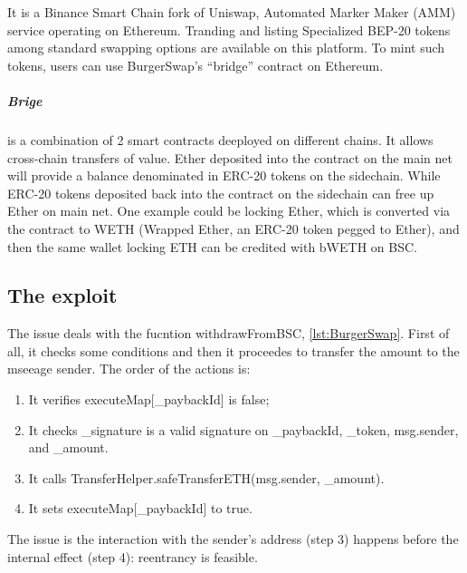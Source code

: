 It is a Binance Smart Chain fork of Uniswap, Automated Marker Maker (AMM) service operating on Ethereum. 
Tranding and listing Specialized BEP-20 tokens among standard swapping options are available on this platform. 
To mint such tokens, users can use 
BurgerSwap's “bridge” contract on Ethereum. 

\subparagraph{Brige} is a combination of 2 smart contracts deeployed on different chains. 
It allows cross-chain transfers of value. Ether deposited into the contract on 
the main net will provide a balance denominated in ERC-20 tokens on the sidechain. 
While ERC-20 tokens deposited back into the contract on the sidechain can free up Ether on main net.
One example could be locking Ether, which is converted via the contract to WETH 
(Wrapped Ether, an ERC-20 token pegged to Ether), and then the same wallet locking ETH can be credited with bWETH on BSC.

\subsection{The exploit}
\label{sec:BurgerSwap:Vulnerability}

The issue deals with the fucntion withdrawFromBSC, \autoref{lst:BurgerSwap}. 
First of all, it checks some conditions and then it proceedes to transfer the amount to the mseeage sender. 
The order of the actions is:
\begin{enumerate}
    \item It verifies executeMap[\_paybackId] is false;
    \item It checks \_signature is a valid signature on \_paybackId, \_token, msg.sender, and \_amount.
    \item It calls TransferHelper.safeTransferETH(msg.sender, \_amount).
    \item It sets executeMap[\_paybackId] to true.
\end{enumerate}

The issue is the interaction with the sender's address (step 3) happens before the internal effect (step 4): reentrancy is feasible.

